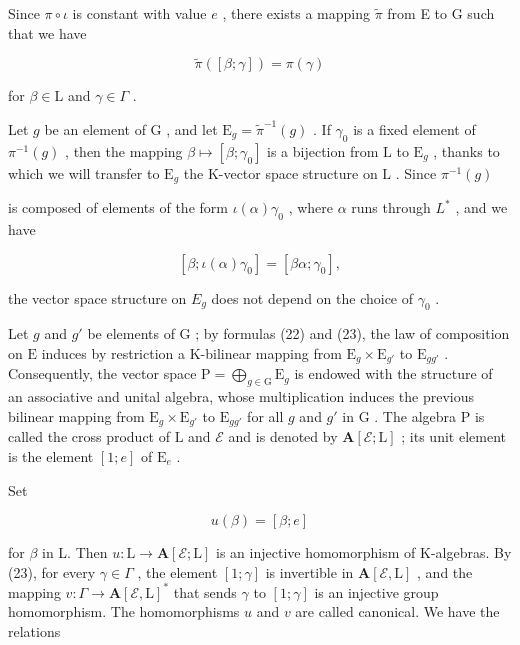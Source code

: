 Since \(\pi \circ \iota\) is constant with value \(e\) , there exists a mapping \(\widetilde{\pi}\) from E to G such that we have

\[
\widetilde {\pi} ([ \beta ; \gamma ]) = \pi (\gamma)\tag{24}
\]

for \(\beta \in \mathrm{L}\) and \(\gamma \in \Gamma\) .

Let \(g\) be an element of \(\mathrm{G}\) , and let \(\mathrm{E}_g = \widetilde{\pi}^{-1}(g)\) . If \(\gamma_0\) is a fixed element of \(\pi^{-1}(g)\) , then the mapping \(\beta \mapsto [\beta; \gamma_0]\) is a bijection from \(\mathrm{L}\) to \(\mathrm{E}_g\) , thanks to which we will transfer to \(\mathrm{E}_g\) the K-vector space structure on \(\mathrm{L}\) . Since \(\pi^{-1}(g)\)

is composed of elements of the form \(\iota(\alpha)\gamma_{0}\) , where \(\alpha\) runs through \(L^{*}\) , and we have

\[
[ \beta ; \iota (\alpha) \gamma_ {0} ] = [ \beta \alpha ; \gamma_ {0} ],
\]

the vector space structure on \(E_{g}\) does not depend on the choice of \(\gamma_{0}\) .

Let \(g\) and \(g'\) be elements of \(\mathrm{G}\) ; by formulas (22) and (23), the law of composition on \(\mathrm{E}\) induces by restriction a K-bilinear mapping from \(\mathrm{E}_g \times \mathrm{E}_{g'}\) to \(\mathrm{E}_{gg'}\) . Consequently, the vector space \(\mathrm{P} = \bigoplus_{g \in \mathrm{G}} \mathrm{E}_g\) is endowed with the structure of an associative and unital algebra, whose multiplication induces the previous bilinear mapping from \(\mathrm{E}_g \times \mathrm{E}_{g'}\) to \(\mathrm{E}_{gg'}\) for all \(g\) and \(g'\) in \(\mathrm{G}\) . The algebra \(\mathrm{P}\) is called the cross product of \(\mathrm{L}\) and \(\mathcal{E}\) and is denoted by \(\mathbf{A}[\mathcal{E};\mathrm{L}]\) ; its unit element is the element \([1;e]\) of \(\mathrm{E}_e\) .

Set

\[
u (\beta) = [ \beta ; e ]\tag{25}
\]

for \(\beta\) in L. Then \(u: \mathrm{L} \to \mathbf{A}[\mathcal{E};\mathrm{L}]\) is an injective homomorphism of K-algebras. By (23), for every \(\gamma \in \Gamma\) , the element \([1;\gamma]\) is invertible in \(\mathbf{A}[\mathcal{E},\mathrm{L}]\) , and the mapping \(v: \Gamma \to \mathbf{A}[\mathcal{E},\mathrm{L}]^*\) that sends \(\gamma\) to \([1;\gamma]\) is an injective group homomorphism. The homomorphisms \(u\) and \(v\) are called canonical. We have the relations

